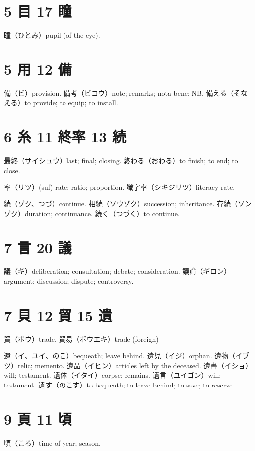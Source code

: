 \section{5 目 17 瞳}

瞳（ひとみ）pupil (of the eye).

\section{5 用 12 備}

備（ビ）provision.
備考（ビコウ）note; remarks; nota bene; NB.
備える（そなえる）to provide; to equip; to install.

\section{6 糸 11 終率 13 続}

最終（サイシュウ）last; final; closing.
終わる（おわる）to finish; to end; to close.

率（リツ）(suf) rate; ratio; proportion.
識字率（シキジリツ）literacy rate.

続（ゾク、つづ）continue.
相続（ソウゾク）succession; inheritance.
存続（ソンゾク）duration; continuance.
続く（つづく）to continue.

\section{7 言 20 議}

議（ギ）deliberation; consultation; debate; consideration.
議論（ギロン）argument; discussion; dispute; controversy.

\section{7 貝 12 貿 15 遺}

貿（ボウ）trade.
貿易（ボウエキ）trade (foreign)

遺（イ、ユイ、のこ）bequeath; leave behind.
遺児（イジ）orphan.
遺物（イブツ）relic; memento.
遺品（イヒン）articles left by the deceased.
遺書（イショ）will; testament.
遺体（イタイ）corpse; remains.
遺言（ユイゴン）will; testament.
遺す（のこす）to bequeath; to leave behind; to save; to reserve.

\section{9 頁 11 頃}

頃（ころ）time of year; season.

